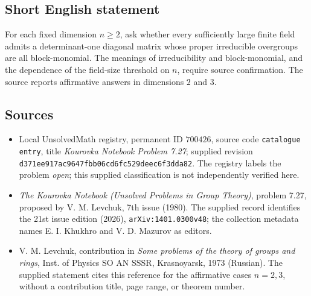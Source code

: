 \documentclass[11pt]{article}
\begin{document}
\subsection{Short English statement}
For each fixed dimension \(n\geq2\), ask whether every sufficiently large finite field admits a determinant-one diagonal matrix whose proper irreducible overgroups are all block-monomial. The meanings of irreducibility and block-monomial, and the dependence of the field-size threshold on \(n\), require source confirmation. The source reports affirmative answers in dimensions \(2\) and \(3\).
\subsection{Sources}
\begin{itemize}
\item Local UnsolvedMath registry, permanent ID \(700426\), source code \texttt{catalogue entry}, title \emph{Kourovka Notebook Problem 7.27}; supplied revision \texttt{d371ee917ac9647fbb06cd6fc529deec6f3dda82}. The registry labels the problem \emph{open}; this supplied classification is not independently verified here.
\item \emph{The Kourovka Notebook (Unsolved Problems in Group Theory)}, problem 7.27, proposed by V. M. Levchuk, 7th issue (1980). The supplied record identifies the 21st issue edition (2026), \texttt{arXiv:1401.0300v48}; the collection metadata names E. I. Khukhro and V. D. Mazurov as editors.
\item V. M. Levchuk, contribution in \emph{Some problems of the theory of groups and rings}, Inst. of Physics SO AN SSSR, Krasnoyarsk, 1973 (Russian). The supplied statement cites this reference for the affirmative cases \(n=2,3\), without a contribution title, page range, or theorem number.
\end{itemize}
\end{document}
